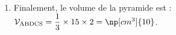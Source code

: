 \begin{enumerate}
\begin{enumerate}
	L'aire du trapèze ABDC est donc :\quad $\mathcal{A}_{\mathrm{ABDC}} = \dfrac{\sqrt{2} + 4\sqrt{2}}{2}\times 3\sqrt{2} =\dfrac{5\sqrt{2}}{2}\times 3\sqrt{2}= \np[cm^2]{15} $
\end{enumerate}
\item Finalement, le volume de la pyramide est :\quad $\mathcal{V}_{\mathrm{ABDCS}} = \dfrac{1}{3} \times 15 \times 2 = \np[cm^3]{10}$.
\end{enumerate}

	\medskip
